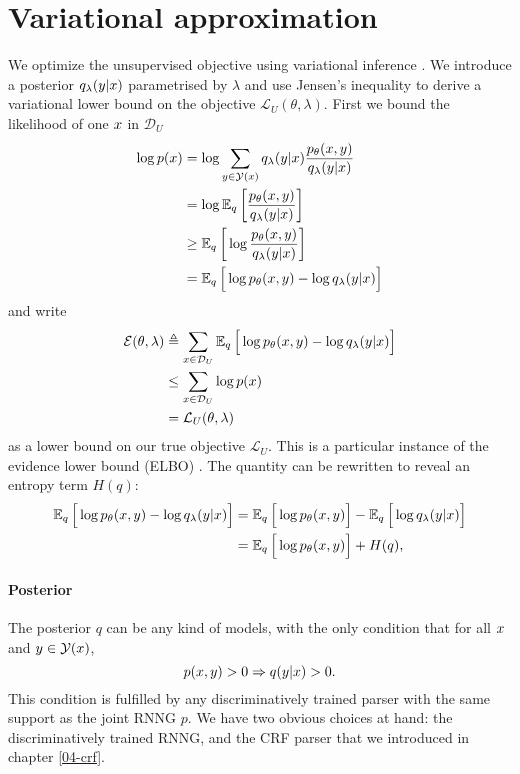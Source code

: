 \section{Variational approximation} We optimize the unsupervised objective using variational inference \citep{blei2016vi}. We introduce a posterior $q_{\lambda}(y | x)$ parametrised by $\lambda$ and use Jensen's inequality to derive a variational lower bound on the objective $\mathcal{L}_U(\theta, \lambda)$. First we bound the likelihood of one $x$ in $\mathcal{D}_U$
\begin{align*}
  \log p (x)
    &= \log \sum_{y  \in \mathcal{Y}(x)} q_{\lambda}(y |x) \frac{p_{\theta}(x,y )}{q_{\lambda}(y | x)} \\
    &= \log \operatorname{\mathbb{E}}_{q} \bigg[\frac{p_{\theta}(x,y )}{ q_{\lambda}(y | x)} \bigg] \\
    &\geq \operatorname{\mathbb{E}}_{q} \bigg[\log \frac{p_{\theta}(x,y )}{q_{\lambda}(y | x)} \bigg] \\
    &= \operatorname{\mathbb{E}}_{q} \Big[\log p_{\theta}(x,y )  - \log q_{\lambda}(y | x) \Big]
  \label{eq:lowerbound}
\end{align*}
and write
\begin{align}
  \operatorname{\mathcal{E}}(\theta, \lambda)
   &\triangleq \sum_{x \in \mathcal{D}_U} \operatorname{\mathbb{E}}_{q} \Big[\log p_{\theta}(x,y )  - \log q_{\lambda}(y | x) \Big] \nonumber \\
   &\leq \sum_{x \in \mathcal{D}_U} \log p (x) \nonumber \\
   &= \mathcal{L}_{U}(\theta, \lambda)
\end{align}
as a lower bound on our true objective $\mathcal{L}_{U}$. This is a particular instance of the evidence lower bound (ELBO) \citep{blei2016vi}. The quantity can be rewritten to reveal an entropy term $H(q)$:
\begin{align*}
  \operatorname{\mathbb{E}}_{q} \Big[\log p_{\theta}(x,y )  - \log  q_{\lambda}(y | x) \Big]
    &=\operatorname{\mathbb{E}}_{q} \Big[\log p_{\theta}(x,y ) \Big]  - \operatorname{\mathbb{E}}_{q} \Big[\log q_{\lambda}(y | x) \Big] \\
    &= \operatorname{\mathbb{E}}_{q} \Big[\log p_{\theta}(x,y ) \Big]  + H(q),
  \label{eq:expectation}
\end{align*}

\paragraph{Posterior}
The posterior $q$ can be any kind of models, with the only condition that for all $ x $ and $ y \in \mathcal{Y}(x)$,
\begin{equation*}
  p(x, y) > 0 \Rightarrow q( y| x ) > 0.
\end{equation*}
This condition is fulfilled by any discriminatively trained parser with the same support as the joint RNNG $p$. We have two obvious choices at hand: the discriminatively trained RNNG, and the CRF parser that we introduced in chapter \ref{04-crf}.

